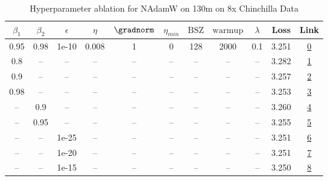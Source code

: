 \begin{table}[H]
\centering
\caption{Hyperparameter ablation for NAdamW on 130m on 8x Chinchilla Data}
\label{tab:ablation_nadamw_130m_on_8x_chinchilla_data}
\begin{tabular}{ccccccccccc}
\toprule
$\beta_1$ & $\beta_2$ & $\epsilon$ & $\eta$ & $\gradnorm$ & $\eta_{min}$ & $\mathrm{BSZ}$ & $\mathrm{warmup}$ & $\lambda$ & Loss & Link \\
\midrule
0.95 & 0.98 & 1e-10 & 0.008 & 1 & 0 & 128 & 2000 & 0.1 & 3.251 & \href{https://wandb.ai/stanford-mercury/optimizer-scaling/runs/sweep-130m-21B-nadamw6383f8lr0.008-wd0.1-minlr0-warmup2000-b10.9-044a64}{0} \\
\midrule
0.8 & -- & -- & -- & -- & -- & -- & -- & -- & 3.282 & \href{https://wandb.ai/stanford-mercury/optimizer-scaling/runs/sweep-130m-21B-nadamwc92c72lr0.008-wd0.1-minlr0-warmup2000-b10.8-2c8117}{1} \\
0.9 & -- & -- & -- & -- & -- & -- & -- & -- & 3.257 & \href{https://wandb.ai/stanford-mercury/optimizer-scaling/runs/sweep-130m-21B-nadamwb1139dlr0.008-wd0.1-minlr0-warmup2000-b10.9-a22589}{2} \\
0.98 & -- & -- & -- & -- & -- & -- & -- & -- & 3.253 & \href{https://wandb.ai/stanford-mercury/optimizer-scaling/runs/sweep-130m-21B-nadamw532224lr0.008-wd0.1-minlr0-warmup2000-b10.9-a9e22e}{3} \\
-- & 0.9 & -- & -- & -- & -- & -- & -- & -- & 3.260 & \href{https://wandb.ai/stanford-mercury/optimizer-scaling/runs/sweep-130m-21B-nadamwebc3a7lr0.008-wd0.1-minlr0-warmup2000-b10.9-2d9521}{4} \\
-- & 0.95 & -- & -- & -- & -- & -- & -- & -- & 3.255 & \href{https://wandb.ai/stanford-mercury/optimizer-scaling/runs/sweep-130m-21B-nadamw6a5715lr0.008-wd0.1-minlr0-warmup2000-b10.9-c46dee}{5} \\
-- & -- & 1e-25 & -- & -- & -- & -- & -- & -- & 3.251 & \href{https://wandb.ai/stanford-mercury/optimizer-scaling/runs/sweep-130m-21B-nadamw47eb94lr0.008-wd0.1-minlr0-warmup2000-b10.9-d49c15}{6} \\
-- & -- & 1e-20 & -- & -- & -- & -- & -- & -- & 3.251 & \href{https://wandb.ai/stanford-mercury/optimizer-scaling/runs/sweep-130m-21B-nadamwf3b7d9lr0.008-wd0.1-minlr0-warmup2000-b10.9-0f4c2b}{7} \\
-- & -- & 1e-15 & -- & -- & -- & -- & -- & -- & 3.250 & \href{https://wandb.ai/stanford-mercury/optimizer-scaling/runs/sweep-130m-21B-nadamw532daalr0.008-wd0.1-minlr0-warmup2000-b10.9-18ddc4}{8} \\

\end{tabular}
\end{table}
